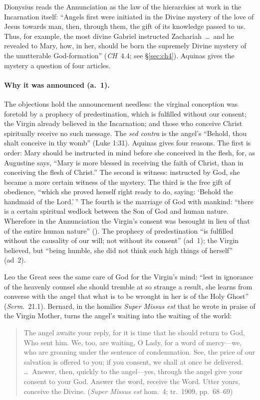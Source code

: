 Dionysius reads the Annunciation as the law of the hierarchies at work in
the Incarnation itself: ``Angels first were initiated in the Divine mystery
of the love of Jesus towards man, then, through them, the gift of its
knowledge passed to us. Thus, for example, the most divine Gabriel
instructed Zachariah~\dots\ and he revealed to Mary, how, in her, should be
born the supremely Divine mystery of the unutterable God-formation''
(\emph{CH}~4.4; see \S\ref{sec:ch4}). Aquinas gives the mystery a question of
four articles.

\paragraph{Why it was announced (a.~1).} The objections hold the
announcement needless: the virginal conception was foretold by a prophecy of
predestination, which is fulfilled without our consent; the Virgin already
believed in the Incarnation; and those who conceive Christ spiritually
receive no such message. The \emph{sed contra} is the angel's ``Behold, thou
shalt conceive in thy womb'' (Luke 1:31). Aquinas gives four reasons. The
first is order: Mary should be instructed in mind before she conceived in
the flesh, for, as Augustine says, ``Mary is more blessed in receiving the
faith of Christ, than in conceiving the flesh of Christ.'' The second is
witness: instructed by God, she became a more certain witness of the
mystery. The third is the free gift of obedience, ``which she proved herself
right ready to do, saying: `Behold the handmaid of the Lord.'\,'' The
fourth is the marriage of God with mankind: ``there is a certain spiritual
wedlock between the Son of God and human nature. Wherefore in the
Annunciation the Virgin's consent was besought in lieu of that of the entire
human nature'' (). The prophecy of
predestination ``is fulfilled without the causality of our will; not without
its consent'' (ad~1); the Virgin believed, but ``being humble, she did not
think such high things of herself'' (ad~2).

Leo the Great sees the same care of God for the Virgin's mind: ``lest in
ignorance of the heavenly counsel she should tremble at so strange a result,
she learns from converse with the angel that what is to be wrought in her
is of the Holy Ghost'' (\emph{Serm.}\ 21.1). Bernard, in the homilies
\emph{Super Missus est} that he wrote in praise of the Virgin Mother, turns
the angel's waiting into the waiting of the world:

\begin{quote}
The angel awaits your reply, for it is time that he should return to God,
Who sent him. We, too, are waiting, O Lady, for a word of mercy---we, who
are groaning under the sentence of condemnation. See, the price of our
salvation is offered to you; if you consent, we shall at once be delivered.
\dots\ Answer, then, quickly to the angel---yes, through the angel give
your consent to your God. Answer the word, receive the Word. Utter yours,
conceive the Divine. (\emph{Super Missus est} hom.~4; tr.\ 1909, pp.\
68--69)
\end{quote}

